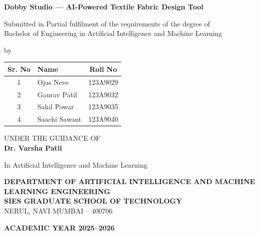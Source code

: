 \begin{titlepage}
\begin{center}
    \vspace*{1cm}
    
    {\Huge \textbf{Dobby Studio — AI-Powered Textile Fabric Design Tool}}
    
    \vspace{2cm}
    
    Submitted in Partial fulfilment of the requirements of the degree of \\
    Bachelor of Engineering in Artificial Intelligence and Machine Learning
    
    \vspace{1cm}
    
    by \\
    \vspace{0.5cm}
    \begin{tabular}{|c|l|c|}
        \hline
        \textbf{Sr. No} & \textbf{Name} & \textbf{Roll No} \\ \hline
        1 & Ojas Neve & 123A9029 \\ \hline
        2 & Gaurav Patil & 123A9032 \\ \hline
        3 & Sahil Powar & 123A9035 \\ \hline
        4 & Saachi Sawant & 123A9040 \\ \hline
    \end{tabular}
    
    \vspace{2cm}
    
    UNDER THE GUIDANCE OF \\
    \textbf{Dr. Varsha Patil}
    
    \vspace{1cm}
    
    In Artificial Intelligence and Machine Learning
    
    \vspace{2cm}
    
    \textbf{DEPARTMENT OF ARTIFICIAL INTELLIGENCE AND MACHINE LEARNING ENGINEERING} \\
    \textbf{SIES GRADUATE SCHOOL OF TECHNOLOGY} \\
    NERUL, NAVI MUMBAI – 400706 \\
    
    \vspace{1cm}
    
    \textbf{ACADEMIC YEAR 2025–2026}
\end{center}
\end{titlepage}
